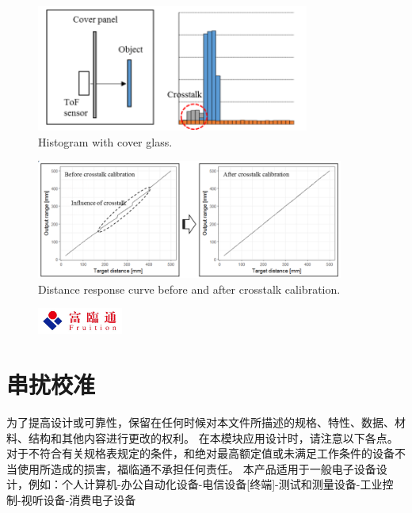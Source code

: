 \documentclass{scrreprt}
\newcommand{\pchapter}[1]{
	\begingroup\let\clearpage\relax
	\newpage
	\begin{figure}[H]
		\includegraphics[width=0.25\textwidth]{logo.jpeg}
	\end{figure}
	\chapter{#1}
	\endgroup
}
\begin{document}
\begin{CJK*}{UTF8}{gbsn}
\begin{figure}[H]
\center\includegraphics[width=0.8\textwidth]{hist_glass.png}
\caption{Histogram with cover glass.}
\label{fig:cover}
\end{figure}

\begin{figure}[H]
\center\includegraphics[width=0.9\textwidth]{crosstalk_calib.png}
\caption{Distance response curve before and after crosstalk calibration.}
\end{figure}

\pchapter{串扰校准}
为了提高设计或可靠性，保留在任何时候对本文件所描述的规格、特性、数据、材料、结构和其他内容进行更改的权利。
在本模块应用设计时，请注意以下各点。
对于不符合有关规格表规定的条件，和绝对最高额定值或未满足工作条件的设备不当使用所造成的损害，福临通不承担任何责任。
本产品适用于一般电子设备设计，例如：个人计算机-办公自动化设备-电信设备[终端]-测试和测量设备-工业控制-视听设备-消费电子设备

\end{CJK*}
\end{document}
